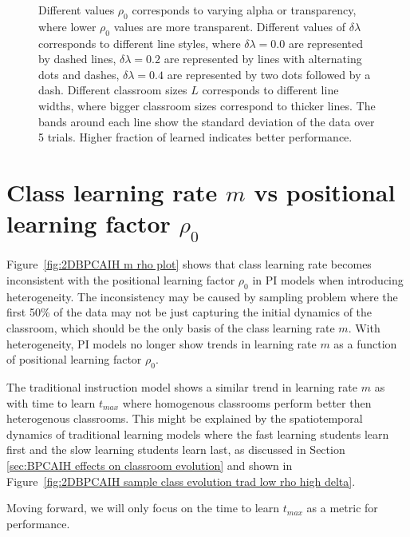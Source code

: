 \begin{figure}[htbp!]
{   Different values $\rho_0$ corresponds to varying alpha or transparency, where lower $\rho_0$ values are more transparent.
   Different values of $\delta\lambda$ corresponds to different line styles, where $\delta\lambda=0.0$ are represented by dashed lines, $\delta\lambda=0.2$ are represented by lines with alternating dots and dashes, $\delta\lambda=0.4$ are represented by two dots followed by a dash.
   Different classroom sizes $L$ corresponds to different line widths, where bigger classroom sizes correspond to thicker lines.
   The bands around each line show the standard deviation of the data over 5 trials.
   Higher fraction of learned indicates better performance.
   }
   \label{fig:2DBPCAIH t-learned comparisons}
\end{figure}

\newpage %

\section{Class learning rate $m$ vs positional learning factor $\rho_0$}\label{sec:BPCAIH m vs rho}

Figure~\ref{fig:2DBPCAIH m rho plot} shows that class learning rate becomes inconsistent with the positional learning factor $\rho_0$ in PI models when introducing heterogeneity. 
The inconsistency may be caused by sampling problem where the first 50\% of the data may not be just capturing the initial dynamics of the classroom, which should be the only basis of the class learning rate $m$.
With heterogeneity, PI models no longer show trends in learning rate $m$ as a function of positional learning factor $\rho_0$.

The traditional instruction model shows a similar trend in learning rate $m$ as with time to learn $t_{max}$ where homogenous classrooms perform better then heterogenous classrooms.
This might be explained by the spatiotemporal dynamics of traditional learning models where the fast learning students learn first and the slow learning students learn last, as discussed in Section \ref{sec:BPCAIH effects on classroom evolution} and shown in Figure~\ref{fig:2DBPCAIH sample class evolution trad low rho high delta}.

Moving forward, we will only focus on the time to learn $t_{max}$ as a metric for performance.

